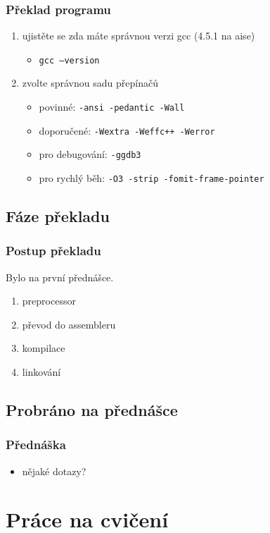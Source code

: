\begin{frame}
	\frametitle{Překlad programu}
	\begin{enumerate}
		\item{ujistěte se zda máte správnou verzi gcc (4.5.1 na aise)}
		\begin{itemize}
			\item{\texttt{gcc --version}}
		\end{itemize}
		\item{zvolte správnou sadu přepínačů}
		\begin{itemize}
			\item{\alert{povinné:} \texttt{-ansi -pedantic -Wall}}
			\item{\alert{doporučené:} \texttt{-Wextra -Weffc++ -Werror}}
			\item{pro debugování: \texttt{-ggdb3}}
			\item{pro rychlý běh: \texttt{-O3 -strip -fomit-frame-pointer}}
		\end{itemize}
	\end{enumerate}
\end{frame}

\subsection{Fáze překladu}

\begin{frame}
	\frametitle{Postup překladu}
	Bylo na první přednášce.
	\begin{enumerate}
		\item{preprocessor}
		\item{převod do assembleru}
		\item{kompilace}
		\item{linkování}
	\end{enumerate}
\end{frame}

\subsection{Probráno na přednášce}

\begin{frame}
	\frametitle{Přednáška}
	\begin{itemize}
		\item{nějaké dotazy?}
	\end{itemize}
\end{frame}

\section{Práce na cvičení}
